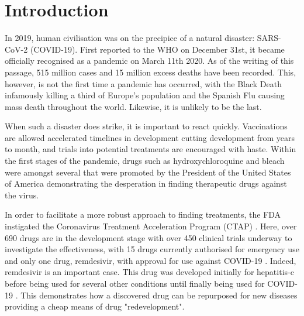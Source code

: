 
\chapter{Introduction}  %

\ifpdf
    \graphicspath{{Chapter1/Figs/Raster/}{Chapter1/Figs/PDF/}{Chapter1/Figs/}}
\else
    \graphicspath{{Chapter1/Figs/Vector/}{Chapter1/Figs/}}
\fi

In 2019, human civilisation was on the precipice of a natural disaster: \mbox{SARS-CoV-2} (\mbox{COVID-19}). First reported to the WHO on December 31st, it became officially recognised as a pandemic on March 11th 2020. As of the writing of this passage, 515 million cases and 15 million excess deaths have been recorded. This, however, is not the first time a pandemic has occurred, with the Black Death infamously killing a third of Europe's population and the Spanish Flu causing mass death throughout the world. Likewise, it is unlikely to be the last.

When such a disaster does strike, it is important to react quickly. Vaccinations are allowed accelerated timelines in development cutting development from years to month, and trials into potential treatments are encouraged with haste. Within the first stages of the pandemic, drugs such as hydroxychloroquine and bleach were amongst several that were promoted by the President of the United States of America demonstrating the desperation in finding therapeutic drugs against the virus.

In order to facilitate a more robust approach to finding treatments, the FDA instigated the Coronavirus Treatment Acceleration Program (CTAP) \cite{CTAP22}. Here, over 690 drugs are in the development stage with over 450 clinical trials underway to investigate the effectiveness, with 15 drugs currently authorised for emergency use and only one drug, remdesivir, with approval for use against \mbox{COVID-19} \cite{CTAP22}. Indeed, remdesivir is an important case. This drug was developed initially for hepatitis-c before being used for several other conditions until finally being used for \mbox{COVID-19} \cite{Joe20}. This demonstrates how a discovered drug can be repurposed for new diseases providing a cheap means of drug "redevelopment".

